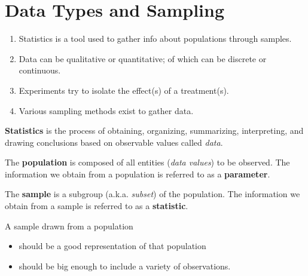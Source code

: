 \documentclass{article}
\begin{document}
\section*{Data Types and Sampling}

\begin{tcolorbox}[colframe=orange!70!white, coltitle=black, title=\textbf{Summary}]
\begin{enumerate}
    \item Statistics is a tool used to gather info about populations through samples.
    \item Data can be qualitative or quantitative; of which can be discrete or continuous.
    \item Experiments try to isolate the effect(s) of a treatment(s).
    \item Various sampling methods exist to gather data.
\end{enumerate}
\end{tcolorbox}
\vspace{0.5in}

\begin{tcolorbox}[colframe=green!60!black,,title=\textbf{Statistics}]
\textbf{Statistics} is the process of obtaining, organizing, summarizing, interpreting, and drawing conclusions based on observable values called \textit{data}.
\end{tcolorbox}
\vspace{10pt}	


\begin{tcolorbox}[colframe=green!60!black,title=\textbf{Population}]
The \textbf{population} is composed of all entities (\textit{data values}) to be observed. The information we obtain from a population is referred to as a \textbf{parameter}.
\end{tcolorbox}
\vspace{6pt}

\begin{tcolorbox}[colframe=green!60!black,title=\textbf{Sample}]
The \textbf{sample} is a subgroup (a.k.a. \textit{subset}) of the population. The information we obtain from a sample is referred to as a \textbf{statistic}.
\end{tcolorbox}
\vspace{6pt}	

A sample drawn from a population
\begin{itemize}
    \item should be a good representation of that population
    \item should be big enough to include a variety of observations.
\end{itemize}
\end{document}
